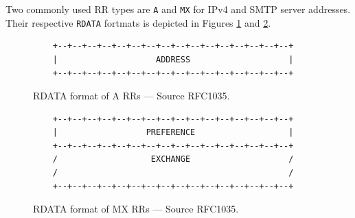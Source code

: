 \documentclass[pdftex,12pt,a4paper]{article}
\begin{document}
            Two commonly used RR types are \texttt{A} and \texttt{MX} for IPv4
            and SMTP server addresses. Their respective \texttt{RDATA} fortmats
            is depicted in Figures \ref{fig:a} and \ref{fig:mx}.

            \begin{figure}[!htb]
                \centering
            \begin{verbatim}    +--+--+--+--+--+--+--+--+--+--+--+--+--+--+--+--+
    |                    ADDRESS                    |
    +--+--+--+--+--+--+--+--+--+--+--+--+--+--+--+--+\end{verbatim}
                \caption{RDATA format of A RRs --- Source RFC1035.}
                \label{fig:a}
            \end{figure}

            \begin{figure}[!htb]
                \centering
            \begin{verbatim}    +--+--+--+--+--+--+--+--+--+--+--+--+--+--+--+--+
    |                  PREFERENCE                   |
    +--+--+--+--+--+--+--+--+--+--+--+--+--+--+--+--+
    /                   EXCHANGE                    /
    /                                               /
    +--+--+--+--+--+--+--+--+--+--+--+--+--+--+--+--+\end{verbatim}
                \caption{RDATA format of MX RRs --- Source RFC1035.}
                \label{fig:mx}
            \end{figure}
\end{document}

